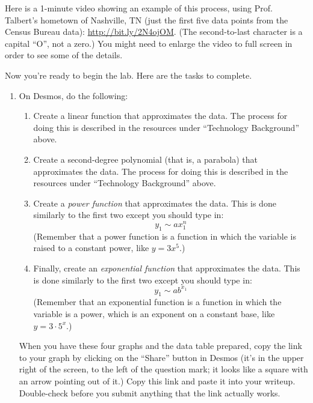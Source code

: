 \documentclass[11pt,letterpaper]{article}
\begin{document}
Here is a 1-minute video showing an example of this process, using Prof. Talbert's hometown of Nashville, TN (just the first five data points from the Census Bureau data): \url{http://bit.ly/2N4ojOM}. (The second-to-last character is a capital ``O'', not a zero.)  You might need to enlarge the video to full screen in order to see some of the details. 

Now you're ready to begin the lab. Here are the tasks to complete. 

\begin{enumerate}
	\item  On Desmos, do the following: 
	\begin{enumerate}
		\item Create a linear function that approximates the data. The process for doing this is described in the resources under ``Technology Background'' above.
		\item Create a second-degree polynomial (that is, a parabola) that approximates the data. The process for doing this is described in the resources under ``Technology Background'' above.
		\item Create a \textit{power function} that approximates the data. This is done similarly to the first two except you should type in: 
		$$y_1 \sim a x_1^n$$
		(Remember that a power function is a function in which the variable is raised to a constant power, like $y = 3 x^5$.) 
		\item Finally, create an \textit{exponential function} that approximates the data. This is done similarly to the first two except you should type in: 
		$$y_1 \sim a b^{x_1}$$
		(Remember that an exponential function is a function in which the variable is a power, which is an exponent on a constant base, like $y = 3 \cdot 5^x$.)
	\end{enumerate}
	When you have these four graphs and the data table prepared, copy the link to your graph by clicking on the ``Share'' button in Desmos (it's in the upper right of the screen, to the left of the question mark; it looks like a square with an arrow pointing out of it.) Copy this link and paste it into your writeup. Double-check before you submit anything that the link actually works. 


\end{enumerate}
\end{document}
